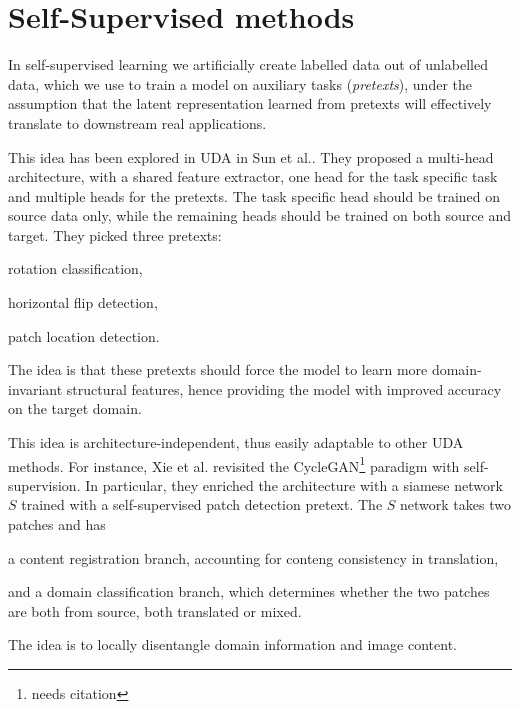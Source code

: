 \section{Self-Supervised methods}
In self-supervised learning we artificially create labelled data out of unlabelled data, which we use to train a model on auxiliary tasks (\emph{pretexts}), under the assumption that the latent representation learned from pretexts will effectively translate to downstream real applications.

This idea has been explored in UDA in Sun et al.\cite{Sun2019}. They proposed a multi-head architecture, with a shared feature extractor, one head for the task specific task and multiple heads for the pretexts. The task specific head should be trained on source data only, while the remaining heads should be trained on both source and target. They picked three pretexts:
\begin{enumerate*}[label=(\roman*)]
    \item rotation classification,
    \item horizontal flip detection,
    \item patch location detection.
\end{enumerate*}
The idea is that these pretexts should force the model to learn more domain-invariant structural features, hence providing the model with improved accuracy on the target domain.

This idea is architecture-independent, thus easily adaptable to other UDA methods. For instance, Xie et al.\cite{Xie2020} revisited the CycleGAN\footnote{needs citation} paradigm with self-supervision. In particular, they enriched the architecture with a siamese network \(S\) trained with a self-supervised patch detection pretext. The \(S\) network takes two patches and has 
\begin{enumerate*}[label=(\roman*)]
    \item a content registration branch, accounting for conteng consistency in translation, 
    \item and a domain classification branch, which determines whether the two patches are both from source, both translated or mixed.
\end{enumerate*}
The idea is to locally disentangle domain information and image content.